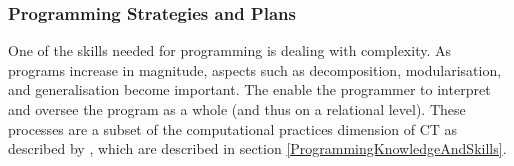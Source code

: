 

%


\subsubsection{Programming Strategies and Plans}\label{sec:plans}

One of the skills needed for programming is dealing with complexity. As programs increase in magnitude, aspects such as decomposition, modularisation, and generalisation become important. The enable the programmer to interpret and oversee the program as a whole (and thus on a relational level). These processes are a subset of the computational practices dimension of CT as described by , which are described in section \ref{ProgrammingKnowledgeAndSkills}.


